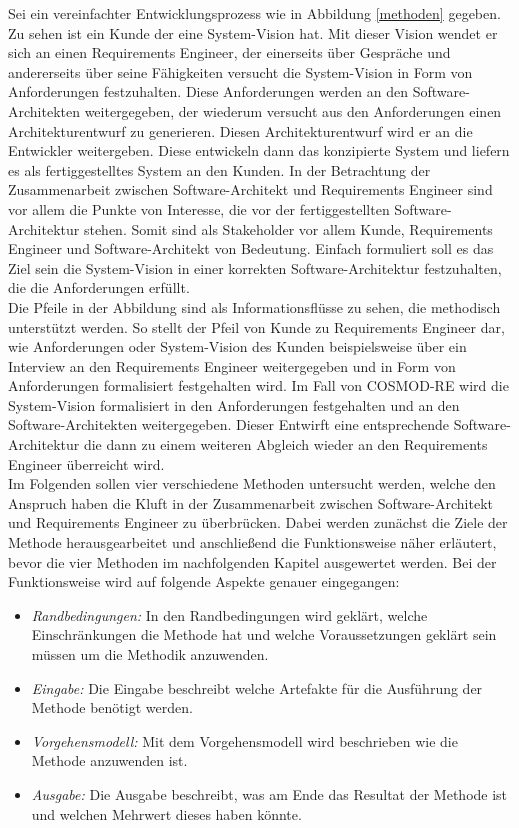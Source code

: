 Sei ein vereinfachter Entwicklungsprozess wie in Abbildung \ref{methoden} gegeben. Zu sehen ist ein Kunde der eine System-Vision hat. Mit dieser Vision wendet er sich an einen Requirements Engineer, der einerseits \"uber Gespr\"ache und andererseits \"uber seine F\"ahigkeiten versucht die System-Vision in Form von Anforderungen festzuhalten. Diese Anforderungen werden an den Software-Architekten weitergegeben, der wiederum versucht aus den Anforderungen einen Architekturentwurf zu generieren. Diesen Architekturentwurf wird er an die Entwickler weitergeben. Diese entwickeln dann das konzipierte System und liefern es als fertiggestelltes System an den Kunden. In der Betrachtung der Zusammenarbeit zwischen Software-Architekt und Requirements Engineer sind vor allem die Punkte von Interesse, die vor der fertiggestellten Software-Architektur stehen. Somit sind als Stakeholder vor allem Kunde, Requirements Engineer und Software-Architekt von Bedeutung. Einfach formuliert soll es das Ziel sein die System-Vision in einer korrekten Software-Architektur festzuhalten, die die Anforderungen erfüllt.\\

Die Pfeile in der Abbildung sind als Informationsflüsse zu sehen, die methodisch unterstützt werden. So stellt der Pfeil von Kunde zu Requirements Engineer dar, wie Anforderungen oder System-Vision des Kunden beispielsweise über ein Interview an den Requirements Engineer weitergegeben und in Form von Anforderungen formalisiert festgehalten wird. Im Fall von COSMOD-RE wird die System-Vision formalisiert in den Anforderungen festgehalten und an den Software-Architekten weitergegeben. Dieser Entwirft eine entsprechende Software-Architektur die dann zu einem weiteren Abgleich wieder an den Requirements Engineer überreicht wird. \\

Im Folgenden sollen vier verschiedene Methoden untersucht werden, welche den Anspruch haben die Kluft in der Zusammenarbeit zwischen Software-Architekt und Requirements Engineer zu \"uberbr\"ucken. Dabei werden zun\"achst die Ziele der Methode herausgearbeitet und anschlie\ss{}end die Funktionsweise n\"aher erl\"autert, bevor die vier Methoden im nachfolgenden Kapitel ausgewertet werden. Bei der Funktionsweise wird auf folgende Aspekte genauer eingegangen: \\

\begin{itemize}
\item \textit{Randbedingungen:} In den Randbedingungen wird gekl\"art, welche Einschr\"ankungen die Methode hat und welche Voraussetzungen gekl\"art sein m\"ussen um die Methodik anzuwenden.
\item \textit{Eingabe:} Die Eingabe beschreibt welche Artefakte f\"ur die Ausf\"uhrung der Methode ben\"otigt werden.
\item \textit{Vorgehensmodell:} Mit dem Vorgehensmodell wird beschrieben wie die Methode anzuwenden ist.
\item \textit{Ausgabe:} Die Ausgabe beschreibt, was am Ende das Resultat der Methode ist und welchen Mehrwert dieses haben k\"onnte.\\
\end{itemize}




